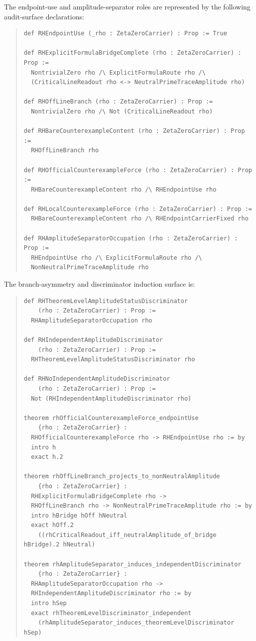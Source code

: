 \documentclass[11pt]{article}
\begin{document}
The endpoint-use and amplitude-separator roles are represented by the following audit-surface declarations:
\begin{quote}\footnotesize\begin{verbatim}
def RHEndpointUse (_rho : ZetaZeroCarrier) : Prop := True

def RHExplicitFormulaBridgeComplete (rho : ZetaZeroCarrier) : Prop :=
  NontrivialZero rho /\ ExplicitFormulaRoute rho /\
  (CriticalLineReadout rho <-> NeutralPrimeTraceAmplitude rho)

def RHOffLineBranch (rho : ZetaZeroCarrier) : Prop :=
  NontrivialZero rho /\ Not (CriticalLineReadout rho)

def RHBareCounterexampleContent (rho : ZetaZeroCarrier) : Prop :=
  RHOffLineBranch rho

def RHOfficialCounterexampleForce (rho : ZetaZeroCarrier) : Prop :=
  RHBareCounterexampleContent rho /\ RHEndpointUse rho

def RHLocalCounterexampleForce (rho : ZetaZeroCarrier) : Prop :=
  RHBareCounterexampleContent rho /\ RHEndpointCarrierFixed rho

def RHAmplitudeSeparatorOccupation (rho : ZetaZeroCarrier) : Prop :=
  RHEndpointUse rho /\ ExplicitFormulaRoute rho /\
  NonNeutralPrimeTraceAmplitude rho
\end{verbatim}\end{quote}

The branch-asymmetry and discriminator induction surface is:
\begin{quote}\footnotesize\begin{verbatim}
def RHTheoremLevelAmplitudeStatusDiscriminator
    (rho : ZetaZeroCarrier) : Prop :=
  RHAmplitudeSeparatorOccupation rho

def RHIndependentAmplitudeDiscriminator
    (rho : ZetaZeroCarrier) : Prop :=
  RHTheoremLevelAmplitudeStatusDiscriminator rho

def RHNoIndependentAmplitudeDiscriminator
    (rho : ZetaZeroCarrier) : Prop :=
  Not (RHIndependentAmplitudeDiscriminator rho)

theorem rhOfficialCounterexampleForce_endpointUse
    {rho : ZetaZeroCarrier} :
  RHOfficialCounterexampleForce rho -> RHEndpointUse rho := by
  intro h
  exact h.2

theorem rhOffLineBranch_projects_to_nonNeutralAmplitude
    {rho : ZetaZeroCarrier} :
  RHExplicitFormulaBridgeComplete rho ->
  RHOffLineBranch rho -> NonNeutralPrimeTraceAmplitude rho := by
  intro hBridge hOff hNeutral
  exact hOff.2
    ((rhCriticalReadout_iff_neutralAmplitude_of_bridge hBridge).2 hNeutral)

theorem rhAmplitudeSeparator_induces_independentDiscriminator
    {rho : ZetaZeroCarrier} :
  RHAmplitudeSeparatorOccupation rho ->
  RHIndependentAmplitudeDiscriminator rho := by
  intro hSep
  exact rhTheoremLevelDiscriminator_independent
    (rhAmplitudeSeparator_induces_theoremLevelDiscriminator hSep)
\end{verbatim}\end{quote}
\end{document}
